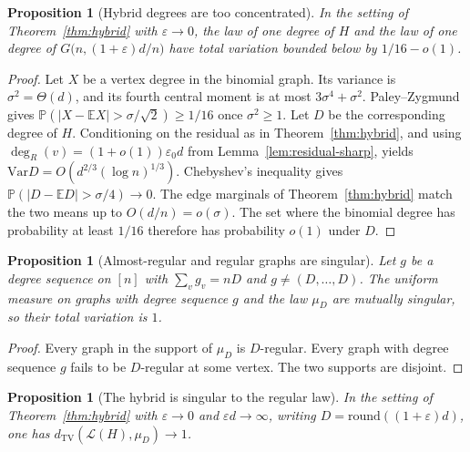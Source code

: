 \documentclass[11pt]{article}
\newtheorem{proposition}[theorem]{Proposition}
\newcommand{\EE}{\mathbb{E}}
\newcommand{\PP}{\mathbb{P}}
\newcommand{\Var}{\mathrm{Var}}
\newcommand{\dTV}{d_{\mathrm{TV}}}
\begin{document}
\begin{proposition}[Hybrid degrees are too concentrated]
\label{prop:hybrid-gap}
In the setting of Theorem~\ref{thm:hybrid} with \(\varepsilon\to 0\), the law of one degree of \(H\) and the law of one degree of \(G\bigl(n,(1+\varepsilon)d/n\bigr)\) have total variation bounded below by \(1/16-o(1)\).
\end{proposition}

\begin{proof}
Let \(X\) be a vertex degree in the binomial graph. Its variance is \(\sigma^2=\Theta(d)\), and its fourth central moment is at most \(3\sigma^4+\sigma^2\).
Paley--Zygmund gives \(\PP(|X-\EE X|>\sigma/\sqrt{2})\ge 1/16\) once \(\sigma^2\ge 1\).
Let \(D\) be the corresponding degree of \(H\). Conditioning on the residual as in Theorem~\ref{thm:hybrid}, and using \(\deg_R(v)=(1+o(1))\varepsilon_0 d\) from Lemma~\ref{lem:residual-sharp}, yields
\(\Var D=O(d^{2/3}(\log n)^{1/3})\).
Chebyshev's inequality gives \(\PP(|D-\EE D|>\sigma/4)\to 0\).
The edge marginals of Theorem~\ref{thm:hybrid} match the two means up to \(O(d/n)=o(\sigma)\).
The set where the binomial degree has probability at least \(1/16\) therefore has probability \(o(1)\) under \(D\).
\end{proof}

\begin{proposition}[Almost-regular and regular graphs are singular]
\label{prop:support-disjoint}
Let \(g\) be a degree sequence on \([n]\) with \(\sum_v g_v=nD\) and \(g\neq(D,\ldots,D)\).
The uniform measure on graphs with degree sequence \(g\) and the law \(\mu_D\) are mutually singular, so their total variation is \(1\).
\end{proposition}

\begin{proof}
Every graph in the support of \(\mu_D\) is \(D\)-regular.
Every graph with degree sequence \(g\) fails to be \(D\)-regular at some vertex.
The two supports are disjoint.
\end{proof}

\begin{proposition}[The hybrid is singular to the regular law]
\label{prop:hybrid-singular}
In the setting of Theorem~\ref{thm:hybrid} with \(\varepsilon\to 0\) and \(\varepsilon d\to\infty\), writing \(D=\mathrm{round}((1+\varepsilon)d)\), one has \(\dTV(\mathcal{L}(H),\mu_D)\to 1\).
\end{proposition}
\end{document}
